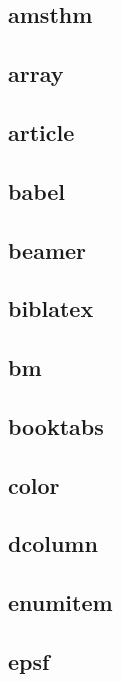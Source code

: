 \documentclass[12pt]{article}
\begin{document}
		\subsection{amsthm}
		
		\subsection{array}
		
		\subsection{article}
		
		\subsection{babel}
		
		\subsection{beamer}
		
		\subsection{biblatex}
		
		\subsection{bm}
		
		\subsection{booktabs}
		
		\subsection{color}
			
		\subsection{dcolumn}
		
		\subsection{enumitem}
		
		\subsection{epsf}
		
\end{document}
